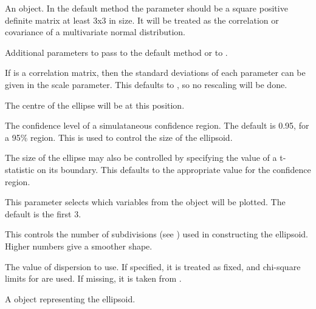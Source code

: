 \documentclass{article}
\begin{document}
\begin{Arguments}
\begin{ldescription}
\item[\code{x}] An object. In the default method the parameter  should be a 
square positive definite matrix at least 3x3
in size. It will be treated as the correlation or covariance 
of a multivariate normal distribution.

\item[\code{...}] Additional parameters to pass to the default method or to .

\item[\code{scale}] If  is a correlation matrix, then the standard deviations of each
parameter can be given in the scale parameter.  This defaults to ,
so no rescaling will be done.

\item[\code{centre}] The centre of the ellipse will be at this position.

\item[\code{level}] The confidence level of a simulataneous confidence region.  The default is
0.95, for a 95\% region.  This is used to control the size of the ellipsoid.

\item[\code{t}] The size of the ellipse may also be controlled by specifying the value
of a t-statistic on its boundary.  This defaults to the appropriate
value for the confidence region.

\item[\code{which}] This parameter selects which variables from the object will be
plotted.  The default is the first 3.

\item[\code{subdivide}] This controls the number of subdivisions (see )
used in constructing the ellipsoid.  Higher numbers give a smoother shape.

\item[\code{dispersion}] The value of dispersion to use.  If specified, it is treated as fixed,
and chi-square limits for  are used. If missing, it is 
taken from .

\end{ldescription}
\end{Arguments}
\begin{Value}
A  object representing the ellipsoid.
\end{Value}
\end{document}
